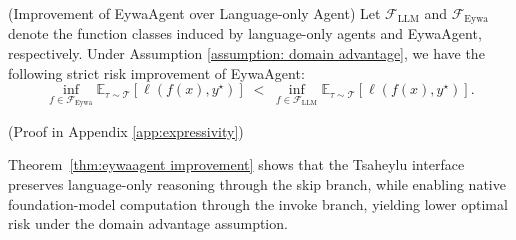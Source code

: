 \begin{theorem}\label{thm:eywaagent improvement}
(Improvement of EywaAgent over Language-only Agent)
Let $\mathcal{F}_{\mathrm{LLM}}$ and $\mathcal{F}_{\mathrm{Eywa}}$ denote the function classes induced by language-only agents and EywaAgent, respectively. Under Assumption \ref{assumption: domain advantage}, 
we have the following strict risk improvement of EywaAgent:
\begin{equation}
\inf_{f \in \mathcal{F}_{\mathrm{Eywa}}} 
\mathbb{E}_{\tau \sim \mathcal{T}}[\ell(f(x), y^\star)]
\;<\;
\inf_{f \in \mathcal{F}_{\mathrm{LLM}}} 
\mathbb{E}_{\tau \sim \mathcal{T}}[\ell(f(x), y^\star)].
\end{equation}
\end{theorem}
(Proof in Appendix \ref{app:expressivity}) 

Theorem~\ref{thm:eywaagent improvement} shows that the Tsaheylu interface preserves language-only reasoning through the skip branch, while enabling native foundation-model computation through the invoke branch, yielding lower optimal risk under the domain advantage assumption.